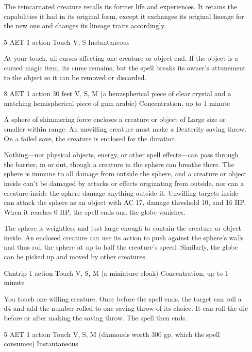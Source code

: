 The reincarnated creature recalls its former life and experiences. It retains the capabilities it had in its original form, except it exchanges its original lineage for the new one and changes its lineage traits accordingly.

{5 AET}
{1 action}
{Touch}
{V, S}
{Instantaneous}

At your touch, all curses affecting one creature or object end. If the object is a cursed magic item, its curse remains, but the spell breaks its owner's attunement to the object so it can be removed or discarded.

{8 AET}
{1 action}
{30 feet}
{V, S, M (a hemispherical piece of clear crystal and a matching hemispherical piece of gum arabic)}
{Concentration, up to 1 minute}

A sphere of shimmering force encloses a creature or object of Large size or smaller within range. An unwilling creature must make a Dexterity saving throw. On a failed save, the creature is enclosed for the duration.

Nothing—not physical objects, energy, or other spell effects—can pass through the barrier, in or out, though a creature in the sphere can breathe there. The sphere is immune to all damage from outside the sphere, and a creature or object inside can't be damaged by attacks or effects originating from outside, nor can a creature inside the sphere damage anything outside it. Unwilling targets inside can attack the sphere as an object with AC 17, damage threshold 10, and 16 HP. When it reaches 0 HP, the spell ends and the globe vanishes.

The sphere is weightless and just large enough to contain the creature or object inside. An enclosed creature can use its action to push against the sphere's walls and thus roll the sphere at up to half the creature's speed. Similarly, the globe can be picked up and moved by other creatures.

{Cantrip}
{1 action}
{Touch}
{V, S, M (a miniature cloak)}
{Concentration, up to 1 minute}

You touch one willing creature. Once before the spell ends, the target can roll a d4 and add the number rolled to one saving throw of its choice. It can roll the die before or after making the saving throw. The spell then ends.

{5 AET}
{1 action}
{Touch}
{V, S, M (diamonds worth 300 gp, which the spell consumes)}
{Instantaneous}

